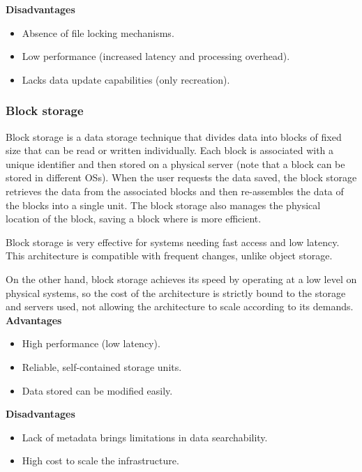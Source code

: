 \noindent\textbf{Disadvantages}
\begin{itemize}
    \item Absence of file locking mechanisms.
    \item Low performance (increased latency and processing overhead).
    \item Lacks data update capabilities (only recreation).
\end{itemize}

\subsubsection*{Block storage}

Block storage is a data storage technique that divides data into blocks of fixed size that can be read or written individually. Each block is associated with a unique identifier and then stored on a physical server (note that a block can be stored in different \glspl{OS}). When the user requests the data saved, the block storage retrieves the data from the associated blocks and then re-assembles the data of the blocks into a single unit. The block storage also manages the physical location of the block, saving a block where is more efficient.

Block storage is very effective for systems needing fast access and low latency. This architecture is compatible with frequent changes, unlike object storage.

On the other hand, block storage achieves its speed by operating at a low level on physical systems, so the cost of the architecture is strictly bound to the storage and servers used, not allowing the architecture to scale according to its demands. \\[3mm]
\noindent\textbf{Advantages}
\begin{itemize}
    \item High performance (low latency).
    \item Reliable, self-contained storage units.
    \item Data stored can be modified easily.
\end{itemize}

\noindent\textbf{Disadvantages}
\begin{itemize}
    \item Lack of metadata brings limitations in data searchability.
    \item High cost to scale the infrastructure.
\end{itemize}

